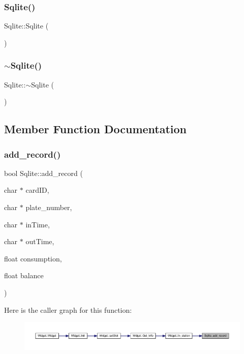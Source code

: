 \subsubsection{\texorpdfstring{Sqlite()}{Sqlite()}}
{\footnotesize\ttfamily Sqlite\+::\+Sqlite (\begin{DoxyParamCaption}{ }\end{DoxyParamCaption})}

\mbox{\label{class_sqlite_adc35a543dca91edc3ffb90a3825dd54a}} 
\subsubsection{\texorpdfstring{$\sim$Sqlite()}{~Sqlite()}}
{\footnotesize\ttfamily Sqlite\+::$\sim$\+Sqlite (\begin{DoxyParamCaption}{ }\end{DoxyParamCaption})}



\subsection{Member Function Documentation}
\mbox{\label{class_sqlite_a128a3fe0ff3ab22960d5e5ec1b5591c3}} 
\subsubsection{\texorpdfstring{add\_record()}{add\_record()}}
{\footnotesize\ttfamily bool Sqlite\+::add\+\_\+record (\begin{DoxyParamCaption}\item[{char $\ast$}]{card\+ID,  }\item[{char $\ast$}]{plate\+\_\+number,  }\item[{char $\ast$}]{in\+Time,  }\item[{char $\ast$}]{out\+Time,  }\item[{float}]{consumption,  }\item[{float}]{balance }\end{DoxyParamCaption})}

Here is the caller graph for this function\+:
\nopagebreak
\begin{figure}[H]
\begin{center}
\leavevmode
\includegraphics[width=350pt]{class_sqlite_a128a3fe0ff3ab22960d5e5ec1b5591c3_icgraph}
\end{center}
\end{figure}
\mbox{\label{class_sqlite_a1e45937d38905ad013e0858ad95d5ffd}} 
